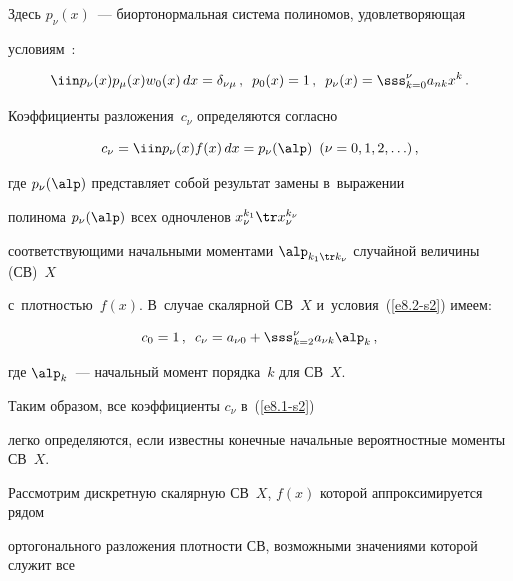 Здесь $p_\nu(x)$~--- биортонормальная система полиномов, удовлетворяющая 

условиям~\cite{1-s2, 2-s2, 5-s2}:

\begin{equation}

\iin p_\nu (x) p_\mu (x) w_0(x)\, dx =\delta_{\nu\mu}\,, \enskip 

p_0 (x) = 1\,,\enskip p_\nu (x) = \sss_{k=0}^\nu a_{nk} x^k\,.

\label{e8.2-s2}

\end{equation}

Коэффициенты разложения~$c_\nu$ определяются согласно

\begin{equation*}

c_\nu = \iin p_\nu (x) f(x)\, dx = p_\nu (\alp) \enskip 

(\nu = 0,1,2,\ldots)\,,


\end{equation*}

где $p_\nu(\alp)$ представляет собой результат замены в~выражении 

полинома  $p_\nu (\alp)$ всех одночленов $x_\nu^{k_1} \tr x_\nu^{k_\nu}$ 

соответствующими начальными моментами $\alp_{k_1\tr k_\nu}$ случайной величины (СВ)~$X$ 

с~плот\-ностью~$f(x)$. В~случае скалярной СВ~$X$ и~условия~(\ref{e8.2-s2}) имеем:

\begin{equation}

c_0 =1\,, \enskip c_\nu = a_{\nu 0} + \sss_{k=2}^\nu a_{\nu k} \alp_k\,,

\label{e8.4-s2}

\end{equation}

где $\alp_k$~--- начальный момент порядка~$k$ для СВ~$X$.



Таким образом, все коэффициенты $c_\nu$ в~(\ref{e8.1-s2}) 

легко определяются, если известны конечные начальные вероятностные моменты СВ~$X$.



 Рассмотрим дискретную скалярную СВ~$X$, $f(x)$ которой аппроксимируется рядом 

 ортогонального разложения плотности СВ, возможными значениями которой служит все 


